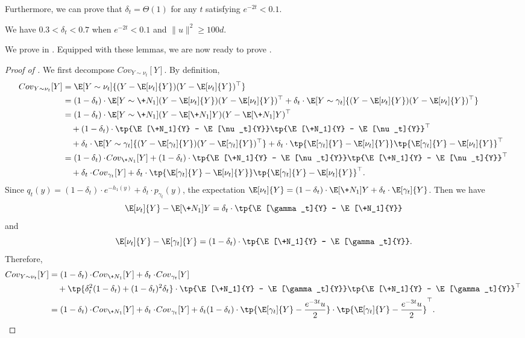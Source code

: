 Furthermore, we can prove that $\delta_t=\Theta(1)$ for any $t$ satisfying $e^{-2t}<0.1$.

\begin{lemma}\label{lem:stitched4}
    We have $0.3 < \delta_t < 0.7$ when $e^{-2t}<0.1$ and $\|u\|^2\geq 100d$.
\end{lemma}

We prove  in . Equipped with these lemmas, we are now ready to prove .
\begin{proof}[Proof of ]
    We first decompose $\!{Cov}_{Y\sim \nu_t}[Y]$.
    By definition,
    \begin{align*}
        \!{Cov}_{Y\sim \nu_t}[Y] &= \E[Y\sim \nu_t]{(Y-\E[\nu_t]{Y})(Y-\E[\nu_t]{Y})^{\top}} \\
        &= (1-\delta_t)\cdot \E[Y\sim \+N_1]{(Y-\E[\nu_t]{Y})(Y-\E[\nu_t]{Y})^{\top}} + \delta_t\cdot \E[Y\sim \gamma_t]{(Y-\E[\nu_t]{Y})(Y-\E[\nu_t]{Y})^{\top}} \\
        &= (1-\delta_t)\cdot \E[Y\sim \+N_1]{(Y-\E[\+N_1]{Y})(Y-\E[\+N_1]{Y})^{\top}} \\
        &\quad + (1-\delta_t) \cdot \tp{\E[\+N_1]{Y} - \E[\nu_t]{Y}}\tp{\E[\+N_1]{Y} - \E[\nu_t]{Y}}^{\top} \\
        &\quad  + \delta_t \cdot \E[Y\sim \gamma_t]{(Y-\E[\gamma_t]{Y})(Y-\E[\gamma_t]{Y})^{\top}} + \delta_t \cdot \tp{\E[\gamma_t]{Y} - \E[\nu_t]{Y}}\tp{\E[\gamma_t]{Y} - \E[\nu_t]{Y}}^{\top} \\
        &= (1-\delta_t)\cdot\!{Cov}_{\+N_1}[Y] + (1-\delta_t) \cdot \tp{\E[\+N_1]{Y} - \E[\nu_t]{Y}}\tp{\E[\+N_1]{Y} - \E[\nu_t]{Y}}^{\top}\\
        &\quad + \delta_t\cdot\!{Cov}_{\gamma_t}[Y] + \delta_t \cdot \tp{\E[\gamma_t]{Y} - \E[\nu_t]{Y}}\tp{\E[\gamma_t]{Y} - \E[\nu_t]{Y}}^{\top}.
    \end{align*}
    Since $q_t(y) = (1-\delta_t)\cdot e^{-h_1(y)} + \delta_t \cdot p_{\gamma_t}(y)$, the expectation $\E[\nu_t]{Y} = (1-\delta_t)\cdot \E[\+N_1]{Y} + \delta_t\cdot \E[\gamma_t]{Y}$. Then we have 
    \[
        \E[\nu_t]{Y} - \E[\+N_1]{Y} = \delta_t\cdot \tp{\E[\gamma_t]{Y} - \E[\+N_1]{Y}} 
    \]
    and
    \[
        \E[\nu_t]{Y} - \E[\gamma_t]{Y} = (1-\delta_t)\cdot \tp{\E[\+N_1]{Y} - \E[\gamma_t]{Y}}.
    \]
    Therefore,
    \begin{align*}
        \!{Cov}_{Y\sim \nu_t}[Y] &= (1-\delta_t)\cdot\!{Cov}_{\+N_1}[Y] + \delta_t\cdot\!{Cov}_{\gamma_t}[Y] \\
        &\quad + \tp{\delta_t^2(1-\delta_t) + (1-\delta_t)^2\delta_t} \cdot \tp{\E[\+N_1]{Y} - \E[\gamma_t]{Y}}\tp{\E[\+N_1]{Y} - \E[\gamma_t]{Y}}^{\top} \\
        & = (1-\delta_t)\cdot \!{Cov}_{\+N_1}[Y] + \delta_t\cdot\!{Cov}_{\gamma_t}[Y] + \delta_t(1-\delta_t) \cdot \tp{\E[\gamma_t]{Y} - \frac{e^{-3t}u}{2}}\cdot \tp{\E[\gamma_t]{Y} - \frac{e^{-3t}u}{2}}^\top.
    \end{align*}


\end{proof}
